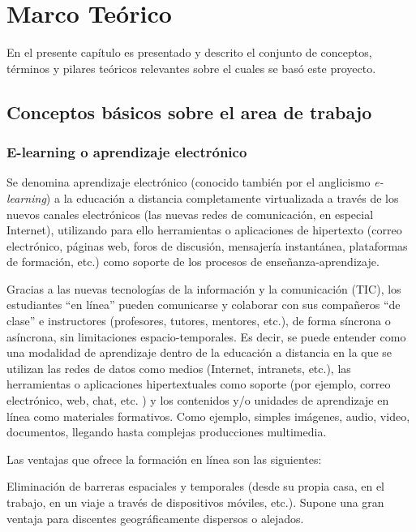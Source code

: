 \chapter{Marco Teórico}
\thispagestyle{empty} %

En el presente capítulo es presentado y descrito el conjunto de conceptos, términos y pilares teóricos relevantes sobre el cuales se basó este proyecto.

\section{Conceptos básicos sobre el area de trabajo}

\subsection{E-learning o aprendizaje electrónico}

Se denomina aprendizaje electrónico (conocido también por el anglicismo \emph{e-learning}) a la educación a distancia completamente virtualizada a través de los nuevos canales electrónicos (las nuevas redes de comunicación, en especial Internet), utilizando para ello herramientas o aplicaciones de hipertexto (correo electrónico, páginas web, foros de discusión, mensajería instantánea, plataformas de formación, etc.) como soporte de los procesos de enseñanza-aprendizaje.

Gracias a las nuevas tecnologías de la información y la comunicación (TIC), los estudiantes ``en línea'' pueden comunicarse y colaborar con sus compañeros ``de clase'' e instructores (profesores, tutores, mentores, etc.), de forma síncrona o asíncrona, sin limitaciones espacio-temporales. Es decir, se puede entender como una modalidad de aprendizaje dentro de la educación a distancia en la que se utilizan las redes de datos como medios (Internet, intranets, etc.), las herramientas o aplicaciones hipertextuales como soporte (por ejemplo, correo electrónico, web, chat, etc. ) y los contenidos y/o unidades de aprendizaje en línea como materiales formativos. Como ejemplo, simples imágenes, audio, video, documentos, llegando hasta complejas producciones multimedia.

Las ventajas que ofrece la formación en línea son las siguientes:

Eliminación de barreras espaciales y temporales (desde su propia casa, en el trabajo, en un viaje a través de dispositivos móviles, etc.). Supone una gran ventaja para discentes geográficamente dispersos o alejados.

